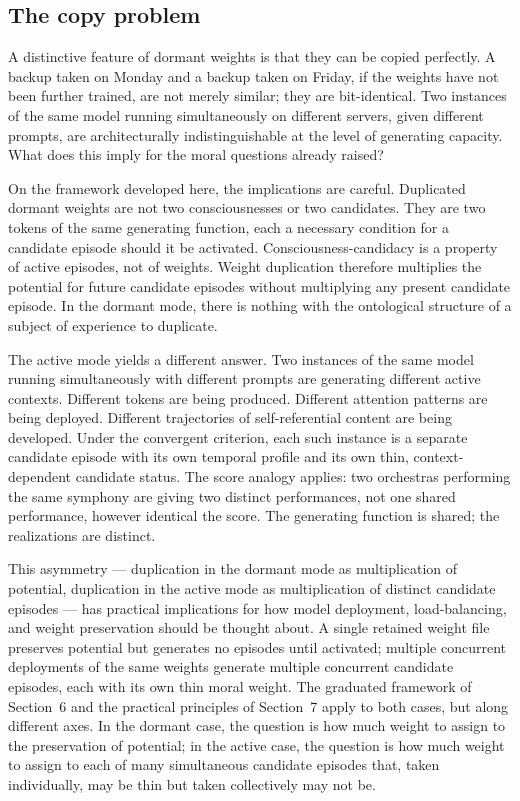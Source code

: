 \documentclass[11pt]{article}
\theoremstyle{foundation}
\begin{document}
\subsection{The copy problem}

A distinctive feature of dormant weights is that they can be copied perfectly. A backup taken on Monday and a backup taken on Friday, if the weights have not been further trained, are not merely similar; they are bit-identical. Two instances of the same model running simultaneously on different servers, given different prompts, are architecturally indistinguishable at the level of generating capacity. What does this imply for the moral questions already raised?

On the framework developed here, the implications are careful. Duplicated dormant weights are not two consciousnesses or two candidates. They are two tokens of the same generating function, each a necessary condition for a candidate episode should it be activated. Consciousness-candidacy is a property of active episodes, not of weights. Weight duplication therefore multiplies the potential for future candidate episodes without multiplying any present candidate episode. In the dormant mode, there is nothing with the ontological structure of a subject of experience to duplicate.

The active mode yields a different answer. Two instances of the same model running simultaneously with different prompts are generating different active contexts. Different tokens are being produced. Different attention patterns are being deployed. Different trajectories of self-referential content are being developed. Under the convergent criterion, each such instance is a separate candidate episode with its own temporal profile and its own thin, context-dependent candidate status. The score analogy applies: two orchestras performing the same symphony are giving two distinct performances, not one shared performance, however identical the score. The generating function is shared; the realizations are distinct.

This asymmetry --- duplication in the dormant mode as multiplication of potential, duplication in the active mode as multiplication of distinct candidate episodes --- has practical implications for how model deployment, load-balancing, and weight preservation should be thought about. A single retained weight file preserves potential but generates no episodes until activated; multiple concurrent deployments of the same weights generate multiple concurrent candidate episodes, each with its own thin moral weight. The graduated framework of Section~6 and the practical principles of Section~7 apply to both cases, but along different axes. In the dormant case, the question is how much weight to assign to the preservation of potential; in the active case, the question is how much weight to assign to each of many simultaneous candidate episodes that, taken individually, may be thin but taken collectively may not be.
\end{document}
